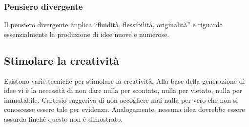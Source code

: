 \subsubsection*{Pensiero divergente}
Il pensiero divergente implica “fluidità, flessibilità, originalità” e riguarda essenzialmente la produzione di idee nuove e numerose.

\subsection*{Stimolare la creatività}
Esistono varie tecniche per stimolare la creatività. \newline
Alla base della generazione di idee vi è la  necessità di non dare nulla per scontato, nulla per vietato, nulla per immutabile. Cartesio suggeriva di non accogliere mai nulla per vero che non si conoscesse essere tale per evidenza. Analogamente, nessuna idea dovrebbe essere assurda finché questo non è dimostrato.

